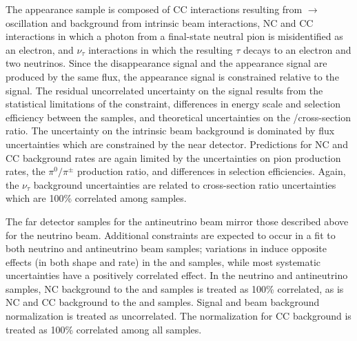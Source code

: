 The \nue appearance sample is composed of \nue CC interactions resulting from \numu$\rightarrow$\nue oscillation
and background from intrinsic beam \nue interactions, NC and
\numu CC interactions in which a photon from a final-state neutral pion is
misidentified as an electron, and $\nu_{\tau}$ interactions in which the resulting $\tau$
decays to an electron and
two neutrinos. Since the
\numu disappearance signal and the \nue appearance signal are produced by the same flux,
the \nue appearance signal is constrained relative to the \numu
signal. The residual uncorrelated uncertainty on the \nue signal results from the statistical
limitations of the \numu constraint, differences in energy scale and selection efficiency between the samples,
and theoretical uncertainties on the \nue/\numu cross-section ratio.
The uncertainty on the intrinsic
beam \nue background is dominated by flux uncertainties which are constrained by the near detector.
Predictions for NC and \numu CC background rates are again limited by the uncertainties on pion
production rates,
the $\pi^{0}/\pi^{\pm}$ production ratio, and
differences in selection efficiencies.
Again, the $\nu_{\tau}$ background uncertainties are related to cross-section ratio uncertainties
which are 100\% correlated among samples.

The far detector samples for the antineutrino beam mirror those described above for the neutrino beam.
Additional constraints are expected to occur in a fit to both neutrino and antineutrino beam samples;
variations in \deltacp induce opposite effects (in both shape and rate) in the \nue and \anue samples,
while most systematic uncertainties have a positively correlated effect.
In the neutrino and antineutrino samples,
NC background to the \numu and \anumu samples is treated as 100\% correlated,
as is NC and \numu CC background to the \nue and \anue samples.
Signal and beam \nue background normalization is treated as uncorrelated.
The normalization for \nutau CC background is treated as 100\% correlated among all samples.


